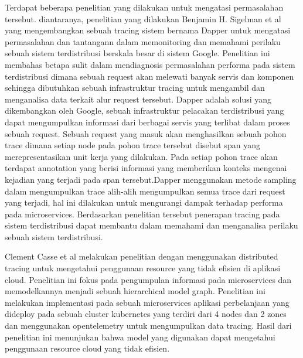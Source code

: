   Terdapat beberapa penelitian yang dilakukan untuk mengatasi permasalahan tersebut. diantaranya, penelitian yang dilakukan Benjamin H. Sigelman et al yang mengembangkan sebuah tracing sistem bernama Dapper untuk mengatasi permasalahan dan tantangann dalam memonitoring dan memahami perilaku sebuah sistem terdistribusi berskala besar di sistem Google. Penelitian ini membahas betapa sulit dalam mendiagnosis permasalahan performa pada sistem terdistribusi dimana sebuah request akan melewati banyak servis dan komponen sehingga dibutuhkan sebuah infrastruktur tracing untuk mengambil dan menganalisa data terkait alur request tersebut. Dapper adalah solusi yang dikembangkan oleh Google, sebuah infrastruktur pelacakan terdistribusi yang dapat mengumpulkan informasi dari berbagai servis yang terlibat dalam proses sebuah request. Sebuah request yang masuk akan menghasilkan sebuah pohon trace dimana setiap node pada pohon trace tersebut disebut span yang merepresentasikan unit kerja yang dilakukan. Pada setiap pohon trace akan terdapat annotation yang berisi informasi yang memberikan konteks mengenai kejadian yang terjadi pada span tersebut.Dapper menggunakan metode sampling dalam mengumpulkan trace alih-alih mengumpulkan semua trace dari request yang terjadi, hal ini dilakukan untuk mengurangi dampak terhadap performa pada microservices. Berdasarkan penelitian tersebut penerapan tracing pada sistem terdistribusi dapat membantu dalam memahami dan menganalisa perilaku sebuah sistem terdistribusi.

  Clement Casse et al melakukan penelitian dengan menggunakan distributed tracing untuk mengetahui penggunaan resource yang tidak efisien di aplikasi cloud. Penelitian ini fokus pada pengumpulan informasi pada microservices dan memodelkannya menjadi sebuah hierarchical model graph. Penelitian ini melakukan implementasi pada sebuah microservices aplikasi perbelanjaan yang dideploy pada sebuah cluster kubernetes yang terdiri dari 4 nodes dan 2 zones dan menggunakan opentelemetry untuk mengumpulkan data tracing. Hasil dari penelitian ini menunjukan bahwa model yang digunakan dapat mengetahui penggunaan resource cloud yang tidak efisien. 

